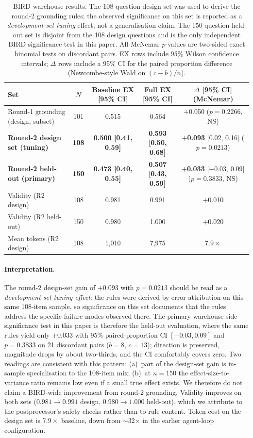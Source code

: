 \documentclass[11pt]{article}
\begin{document}
\begin{table}[t]
\centering
\caption{BIRD warehouse results. The 108-question design set was used to derive the round-2 grounding rules; the observed significance on this set is reported as a \emph{development-set tuning} effect, not a generalisation claim. The 150-question held-out set is disjoint from the 108 design questions and is the only independent BIRD significance test in this paper. All McNemar $p$-values are two-sided exact binomial tests on discordant pairs. EX rows include 95\% Wilson confidence intervals; $\Delta$ rows include a 95\% CI for the paired proportion difference (Newcombe-style Wald on $(c-b)/n$).}
\label{tab:bird}
\begin{tabular}{lcccc}
\toprule
Set & $N$ & Baseline EX [95\% CI] & Full EX [95\% CI] & $\Delta$ [95\% CI] (McNemar) \\
\midrule
Round-1 grounding (design, subset) & 101 & 0.515 & 0.564 & $+$0.050 ($p=0.2266$, NS) \\
\textbf{Round-2 design set (tuning)} & \textbf{108} & \textbf{0.500 [0.41, 0.59]} & \textbf{0.593 [0.50, 0.68]} & $+$\textbf{0.093} [0.02, 0.16] ($p=0.0213$) \\
\textbf{Round-2 held-out (primary)}  & \textbf{150} & \textbf{0.473 [0.40, 0.55]} & \textbf{0.507 [0.43, 0.59]} & $+$\textbf{0.033} [$-$0.03, 0.09] ($p=0.3833$, NS) \\
\midrule
Validity (R2 design) & 108 & 0.981 & 0.991 & $+$0.010 \\
Validity (R2 held-out) & 150 & 0.980 & 1.000 & $+$0.020 \\
Mean tokens (R2 design) & 108 & 1{,}010 & 7{,}975 & $7.9\times$ \\
\bottomrule
\end{tabular}
\end{table}

\paragraph{Interpretation.} The round-2 design-set gain of $+0.093$ with $p=0.0213$ should be read as a \emph{development-set tuning effect}: the rules were derived by error attribution on this same 108-item sample, so significance on this set documents that the rules address the specific failure modes observed there. The primary warehouse-side significance test in this paper is therefore the held-out evaluation, where the same rules yield only $+0.033$ with 95\% paired-proportion CI $[-0.03, 0.09]$ and $p=0.3833$ on 21 discordant pairs ($b=8$, $c=13$); direction is preserved, magnitude drops by about two-thirds, and the CI comfortably covers zero. Two readings are consistent with this pattern: (a)~part of the design-set gain is in-sample specialisation to the 108-item mix; (b)~at $n=150$ the effect-size-to-variance ratio remains low even if a small true effect exists. We therefore do not claim a BIRD-wide improvement from round-2 grounding. Validity improves on both sets ($0.981\to 0.991$ design, $0.980\to 1.000$ held-out), which we attribute to the postprocessor's safety checks rather than to rule content. Token cost on the design set is $7.9\times$ baseline, down from $\sim$32$\times$ in the earlier agent-loop configuration.
\end{document}
